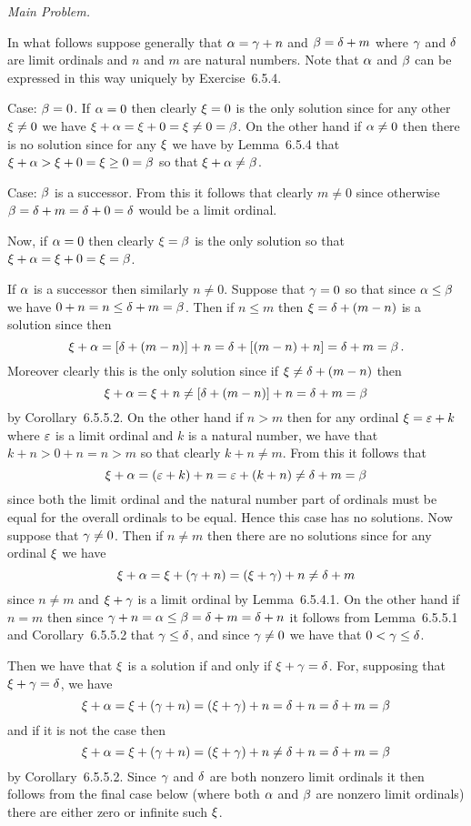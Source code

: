 \begin{solution}
    \emph{Main Problem.}
    
    In what follows suppose generally that $\alpha = \gamma + n$ and $\beta = \delta + m$ where $\gamma$ and $\delta$ are limit ordinals and $n$ and $m$ are natural numbers.
    Note that $\alpha$ and $\beta$ can be expressed in this way uniquely by Exercise~6.5.4.

    Case: $\beta = 0$.
    If $\alpha = 0$ then clearly $\xi = 0$ is the only solution since for any other $\xi \neq 0$ we have $\xi + \alpha = \xi + 0 = \xi \neq 0 = \beta$.
    On the other hand if $\alpha \neq 0$ then there is no solution since for any $\xi$ we have by Lemma~6.5.4 that $\xi + \alpha > \xi + 0 = \xi \geq 0 = \beta$ so that $\xi + \alpha \neq \beta$.

    Case: $\beta$ is a successor.
    From this it follows that clearly $m \neq 0$ since otherwise $\beta = \delta + m = \delta + 0 = \delta$ would be a limit ordinal.

    Now, if $\alpha = 0$ then clearly $\xi = \beta$ is the only solution so that $\xi + \alpha = \xi + 0 = \xi = \beta$.

    If $\alpha$ is a successor then similarly $n \neq 0$.
    Suppose that $\gamma = 0$ so that since $\alpha \leq \beta$ we have $0 + n = n \leq \delta + m = \beta$.
    Then if $n \leq m$ then $\xi = \delta + (m - n)$ is a solution since then
    $$
    \xi + \alpha = [\delta + (m-n)] + n = \delta + [(m-n) + n] = \delta + m = \beta \,.
    $$
    Moreover clearly this is the only solution since if $\xi \neq \delta + (m-n)$ then
    $$
    \xi + \alpha = \xi + n \neq [\delta + (m-n)] + n = \delta + m = \beta
    $$
    by Corollary~6.5.5.2.
    On the other hand if $n > m$ then for any ordinal $\xi = \varepsilon + k$ where $\varepsilon$ is a limit ordinal and $k$ is a natural number, we have that $k + n > 0 + n = n > m$ so that clearly $k + n \neq m$.
    From this it follows that
    $$
    \xi + \alpha = (\varepsilon + k) + n = \varepsilon + (k + n) \neq \delta + m = \beta
    $$
    since both the limit ordinal and the natural number part of ordinals must be equal for the overall ordinals to be equal.
    Hence this case has no solutions.
    Now suppose that $\gamma \neq 0$.
    Then if $n \neq m$ then there are no solutions since for any ordinal $\xi$ we have
    $$
    \xi + \alpha = \xi + (\gamma + n) = (\xi + \gamma) + n \neq \delta + m
    $$
    since $n \neq m$ and $\xi + \gamma$ is a limit ordinal by Lemma~6.5.4.1.
    On the other hand if $n = m$ then since $\gamma + n = \alpha \leq \beta = \delta + m = \delta + n$ it follows from Lemma~6.5.5.1 and Corollary~6.5.5.2 that $\gamma \leq \delta$, and since $\gamma \neq 0$ we have that $0 < \gamma \leq \delta$.

    Then we have that $\xi$ is a solution if and only if $\xi + \gamma = \delta$.
    For, supposing that $\xi + \gamma = \delta$, we have
    $$
    \xi + \alpha = \xi + (\gamma + n) = (\xi + \gamma) + n = \delta + n = \delta + m = \beta
    $$
    and if it is not the case then
    $$
    \xi + \alpha = \xi + (\gamma + n) = (\xi + \gamma) + n \neq \delta + n = \delta + m = \beta
    $$
    by Corollary~6.5.5.2.
    Since $\gamma$ and $\delta$ are both nonzero limit ordinals it then follows from the final case below (where both $\alpha$ and $\beta$ are nonzero limit ordinals) there are either zero or infinite such $\xi$.


\end{solution}

